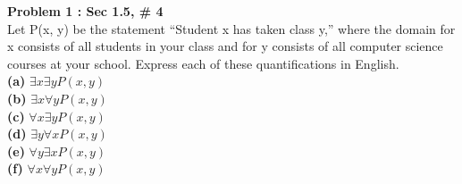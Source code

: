 \documentclass[10pt]{article}
\newcommand{\problem}[3]{\noindent\textbf{Problem #1 : Sec #2, \# #3}\\}
\newcommand{\subproblem}[1]{\\\noindent\textbf{(#1)}}
\begin{document}
 
\problem{1}{1.5}{4}
Let P(x, y) be the statement “Student x has taken class y,” where the domain for x consists of all students in your class and for y consists of all computer science courses at your school. Express each of these quantifications in English.
\subproblem{a} $\exists{x}\exists{y}P(x,y)$
\subproblem{b} $\exists{x}\forall{y}P(x,y)$
\subproblem{c} $\forall{x}\exists{y}P(x,y)$
\subproblem{d} $\exists{y}\forall{x}P(x,y)$
\subproblem{e} $\forall{y}\exists{x}P(x,y)$
\subproblem{f} $\forall{x}\forall{y}P(x,y)$
\end{document}
